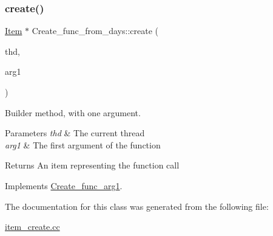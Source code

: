 \subsubsection{\texorpdfstring{create()}{create()}}
{\footnotesize\ttfamily \mbox{\hyperlink{classItem}{Item}} $\ast$ Create\+\_\+func\+\_\+from\+\_\+days\+::create (\begin{DoxyParamCaption}\item[{T\+HD $\ast$}]{thd,  }\item[{\mbox{\hyperlink{classItem}{Item}} $\ast$}]{arg1 }\end{DoxyParamCaption})\hspace{0.3cm}{\ttfamily [virtual]}}

Builder method, with one argument. 
\begin{DoxyParams}{Parameters}
{\em thd} & The current thread \\
\hline
{\em arg1} & The first argument of the function \\
\hline
\end{DoxyParams}
\begin{DoxyReturn}{Returns}
An item representing the function call 
\end{DoxyReturn}


Implements \mbox{\hyperlink{classCreate__func__arg1_a3e9a98f755cd82c3e762e334c955a8c9}{Create\+\_\+func\+\_\+arg1}}.



The documentation for this class was generated from the following file\+:\begin{DoxyCompactItemize}
\item 
\mbox{\hyperlink{item__create_8cc}{item\+\_\+create.\+cc}}\end{DoxyCompactItemize}
